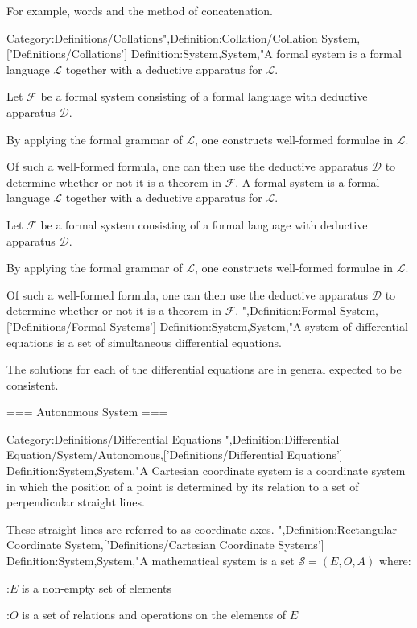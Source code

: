 For example, words and the method of concatenation.


Category:Definitions/Collations",Definition:Collation/Collation System,['Definitions/Collations']
Definition:System,System,"A formal system is a formal language $\mathcal L$ together with a deductive apparatus for $\mathcal L$.


Let $\mathcal F$ be a formal system consisting of a formal language with deductive apparatus $\mathcal D$.

By applying the formal grammar of $\mathcal L$, one constructs well-formed formulae in $\mathcal L$.

Of such a well-formed formula, one can then use the deductive apparatus $\mathcal D$ to determine whether or not it is a theorem in $\mathcal F$.
A formal system is a formal language $\mathcal L$ together with a deductive apparatus for $\mathcal L$.


Let $\mathcal F$ be a formal system consisting of a formal language with deductive apparatus $\mathcal D$.

By applying the formal grammar of $\mathcal L$, one constructs well-formed formulae in $\mathcal L$.

Of such a well-formed formula, one can then use the deductive apparatus $\mathcal D$ to determine whether or not it is a theorem in $\mathcal F$.
",Definition:Formal System,['Definitions/Formal Systems']
Definition:System,System,"A system of differential equations is a set of simultaneous differential equations.

The solutions for each of the differential equations are in general expected to be consistent.


=== Autonomous System ===


Category:Definitions/Differential Equations
",Definition:Differential Equation/System/Autonomous,['Definitions/Differential Equations']
Definition:System,System,"A Cartesian coordinate system is a coordinate system in which the position of a point is determined by its relation to a set of perpendicular straight lines.

These straight lines are referred to as coordinate axes.
",Definition:Rectangular Coordinate System,['Definitions/Cartesian Coordinate Systems']
Definition:System,System,"A mathematical system is a set $\mathcal S = \left( E, O, A \right)$ where:

:$E$ is a non-empty set of elements

:$O$ is a set of relations and operations on the elements of $E$

